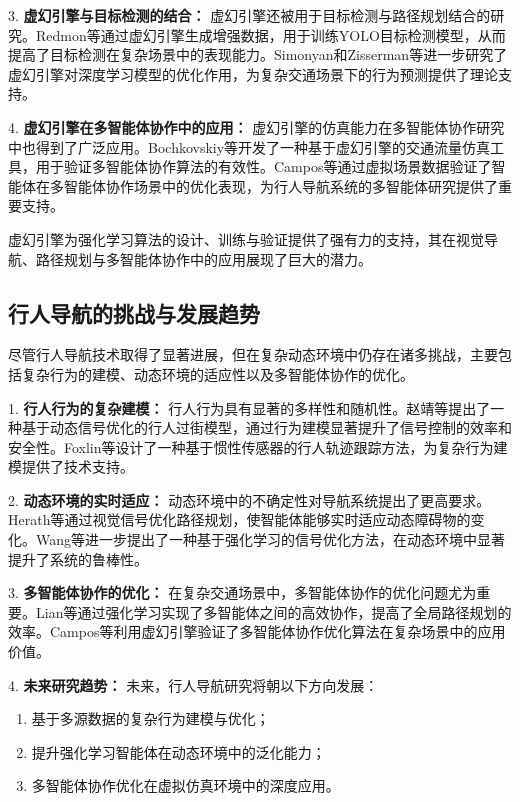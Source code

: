 3. \textbf{虚幻引擎与目标检测的结合：} 虚幻引擎还被用于目标检测与路径规划结合的研究。Redmon等\cite{redmon2017yolo9000}通过虚幻引擎生成增强数据，用于训练YOLO目标检测模型，从而提高了目标检测在复杂场景中的表现能力。Simonyan和Zisserman等\cite{simonyan2014action}进一步研究了虚幻引擎对深度学习模型的优化作用，为复杂交通场景下的行为预测提供了理论支持。

4. \textbf{虚幻引擎在多智能体协作中的应用：} 虚幻引擎的仿真能力在多智能体协作研究中也得到了广泛应用。Bochkovskiy等\cite{bochkovskiy2020yolov4}开发了一种基于虚幻引擎的交通流量仿真工具，用于验证多智能体协作算法的有效性。Campos等\cite{campos2021orbslam3}通过虚拟场景数据验证了智能体在多智能体协作场景中的优化表现，为行人导航系统的多智能体研究提供了重要支持。

虚幻引擎为强化学习算法的设计、训练与验证提供了强有力的支持，其在视觉导航、路径规划与多智能体协作中的应用展现了巨大的潜力。

\subsection*{行人导航的挑战与发展趋势}

尽管行人导航技术取得了显著进展，但在复杂动态环境中仍存在诸多挑战，主要包括复杂行为的建模、动态环境的适应性以及多智能体协作的优化。

1. \textbf{行人行为的复杂建模：} 行人行为具有显著的多样性和随机性。赵靖等\cite{zhao2014crossing}提出了一种基于动态信号优化的行人过街模型，通过行为建模显著提升了信号控制的效率和安全性。Foxlin等\cite{foxlin2005tracking}设计了一种基于惯性传感器的行人轨迹跟踪方法，为复杂行为建模提供了技术支持。

2. \textbf{动态环境的实时适应：} 动态环境中的不确定性对导航系统提出了更高要求。Herath等\cite{herath2020ronin}通过视觉信号优化路径规划，使智能体能够实时适应动态障碍物的变化。Wang等\cite{wang2013densetrajectory}进一步提出了一种基于强化学习的信号优化方法，在动态环境中显著提升了系统的鲁棒性。

3. \textbf{多智能体协作的优化：} 在复杂交通场景中，多智能体协作的优化问题尤为重要。Lian等\cite{lian2023inverseql}通过强化学习实现了多智能体之间的高效协作，提高了全局路径规划的效率。Campos等\cite{campos2021orbslam3}利用虚幻引擎验证了多智能体协作优化算法在复杂场景中的应用价值。

4. \textbf{未来研究趋势：} 未来，行人导航研究将朝以下方向发展：

\begin{enumerate}
  \item 基于多源数据的复杂行为建模与优化；
  \item 提升强化学习智能体在动态环境中的泛化能力；
  \item 多智能体协作优化在虚拟仿真环境中的深度应用。
\end{enumerate}

